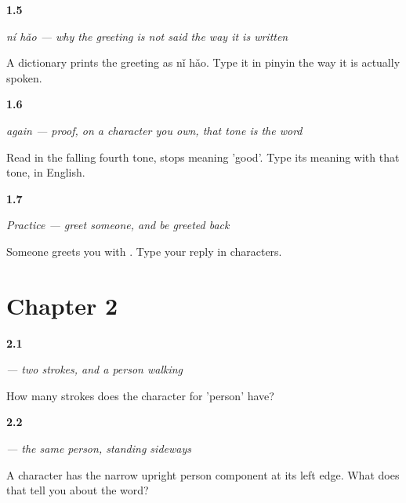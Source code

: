 \noindent\begin{minipage}[t]{\linewidth}
\raggedright
\hypertarget{review-ZH-C01-tone-sandhi-spoken}{\textbf{1.5}} \emph{ní hǎo — why the greeting is not said the way it is written}\par
\small A dictionary prints the greeting as nǐ hǎo. Type it in pinyin the way it is actually spoken.
\end{minipage}\par\medskip

\noindent\begin{minipage}[t]{\linewidth}
\raggedright
\hypertarget{review-ZH-C01-hao-fond-tone}{\textbf{1.6}} \emph{ again — proof, on a character you own, that tone is the word}\par
\small Read in the falling fourth tone,  stops meaning 'good'. Type its meaning with that tone, in English.
\end{minipage}\par\medskip

\noindent\begin{minipage}[t]{\linewidth}
\raggedright
\hypertarget{review-ZH-C01-practice-greet}{\textbf{1.7}} \emph{Practice — greet someone, and be greeted back}\par
\small Someone greets you with . Type your reply in characters.
\end{minipage}\par\medskip

\section*{Chapter 2}

\noindent\begin{minipage}[t]{\linewidth}
\raggedright
\hypertarget{review-ZH-W01-ren-strokes}{\textbf{2.1}} \emph{ — two strokes, and a person walking}\par
\small How many strokes does the character for 'person' have?
\end{minipage}\par\medskip

\noindent\begin{minipage}[t]{\linewidth}
\raggedright
\hypertarget{review-ZH-W01-ren-radical-meaning}{\textbf{2.2}} \emph{ — the same person, standing sideways}\par
\small A character has the narrow upright person component at its left edge. What does that tell you about the word?
\end{minipage}\par\medskip

